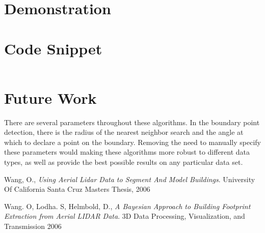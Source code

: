 \documentclass{InsightArticle}
\begin{document}
\section{Demonstration}
\label{sec:Demonstration}


\section{Code Snippet}

\begin{verbatim}

\end{verbatim}

\section{Future Work}
There are several parameters throughout these algorithms. In the boundary point detection, there is the radius of the nearest neighbor search and the angle at which to declare a point on the boundary. Removing the need to manually specify these parameters would making these algorithms more robust to different data types, as well as provide the best possible results on any particular data set.

\begin{thebibliography}{9}

	  Wang, O.,
	  \emph{Using Aerial Lidar Data to Segment And Model Buildings}.
	  University Of California Santa Cruz Masters Thesis, 2006


	  Wang. O, Lodha. S, Helmbold, D.,
	  \emph{A Bayesian Approach to Building Footprint Extraction from Aerial LIDAR Data}.
	  3D Data Processing, Visualization, and Transmission 2006

\end{thebibliography}
\end{document}
